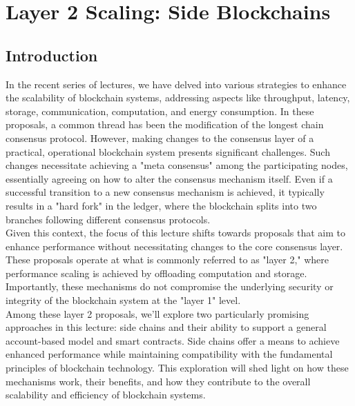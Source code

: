 \chapter{Layer 2 Scaling: Side Blockchains}
\section{Introduction}

In the recent series of lectures, we have delved into various strategies to enhance the scalability of blockchain systems, addressing aspects like throughput, latency, storage, communication, computation, and energy consumption. In these proposals, a common thread has been the modification of the longest chain consensus protocol. However, making changes to the consensus layer of a practical, operational blockchain system presents significant challenges. Such changes necessitate achieving a "meta consensus" among the participating nodes, essentially agreeing on how to alter the consensus mechanism itself. Even if a successful transition to a new consensus mechanism is achieved, it typically results in a "hard fork" in the ledger, where the blockchain splits into two branches following different consensus protocols.\\
Given this context, the focus of this lecture shifts towards proposals that aim to enhance performance without necessitating changes to the core consensus layer. These proposals operate at what is commonly referred to as "layer 2," where performance scaling is achieved by offloading computation and storage. Importantly, these mechanisms do not compromise the underlying security or integrity of the blockchain system at the "layer 1" level.\\
Among these layer 2 proposals, we'll explore two particularly promising approaches in this lecture: side chains and their ability to support a general account-based model and smart contracts. Side chains offer a means to achieve enhanced performance while maintaining compatibility with the fundamental principles of blockchain technology. This exploration will shed light on how these mechanisms work, their benefits, and how they contribute to the overall scalability and efficiency of blockchain systems.

